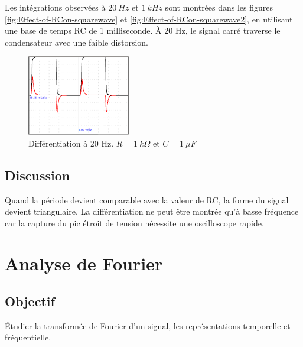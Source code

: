 \documentclass{book}
\begin{document}
Les intégrations observées à $20\ Hz$ et $1\ kHz$ sont montrées dans les figures  \ref{fig:Effect-of-RCon-squarewave} et  \ref{fig:Effect-of-RCon-squarewave2}, en utilisant une base de temps RC de 1 milliseconde. À 20 Hz, le signal carré traverse le condensateur avec une faible distorsion.
\begin{figure}[h!]
\begin{center}
\caption{\label{}Différentiation à 20 Hz. $R = 1\ k\Omega$  et $C = 1\ \mu F$ }\vspace{0.5em}
\includegraphics[width=0.4\textwidth, height=0.3\textwidth, keepaspectratio]{Pic-squarewave-diff20hz.png}
\end{center}
\end{figure}

\subsection{Discussion}


Quand la période devient comparable avec la valeur de RC, la forme du signal devient triangulaire. La différentiation ne peut être montrée qu'à basse fréquence car la capture du pic étroit de tension nécessite une oscilloscope rapide.







\section{Analyse de Fourier}



\subsection{Objectif}


Étudier la transformée de Fourier d'un signal, les représentations temporelle et fréquentielle.
\end{document}
